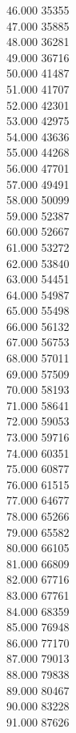 { 46.000	35355 \\
 47.000	35885 \\
 48.000	36281 \\
 49.000	36716 \\
 50.000	41487 \\
 51.000	41707 \\
 52.000	42301 \\
 53.000	42975 \\
 54.000	43636 \\
 55.000	44268 \\
 56.000	47701 \\
 57.000	49491 \\
 58.000	50099 \\
 59.000	52387 \\
 60.000	52667 \\
 61.000	53272 \\
 62.000	53840 \\
 63.000	54451 \\
 64.000	54987 \\
 65.000	55498 \\
 66.000	56132 \\
 67.000	56753 \\
 68.000	57011 \\
 69.000	57509 \\
 70.000	58193 \\
 71.000	58641 \\
 72.000	59053 \\
 73.000	59716 \\
 74.000	60351 \\
 75.000	60877 \\
 76.000	61515 \\
 77.000	64677 \\
 78.000	65266 \\
 79.000	65582 \\
 80.000	66105 \\
 81.000	66809 \\
 82.000	67716 \\
 83.000	67761 \\
 84.000	68359 \\
 85.000	76948 \\
 86.000	77170 \\
 87.000	79013 \\
 88.000	79838 \\
 89.000	80467 \\
 90.000	83228 \\
 91.000	87626 \\
}
